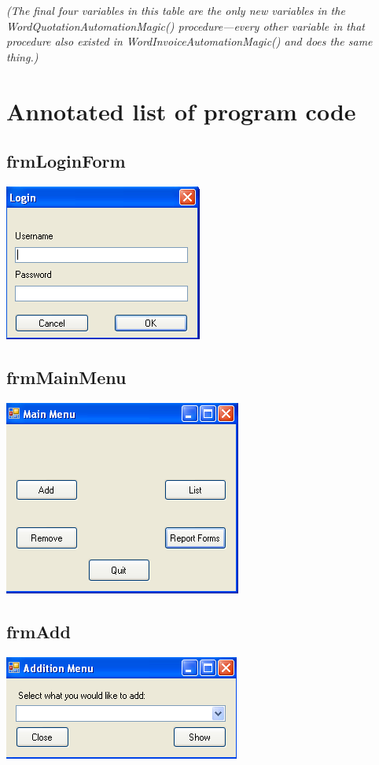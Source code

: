 	\textsl{(The final four variables in this table are the only new variables in the WordQuotationAutomationMagic() procedure---every other variable in that procedure also existed in WordInvoiceAutomationMagic() and does the same thing.)} 

	\section{Annotated list of program code}
	
\subsection{frmLoginForm}
	\includegraphics[scale=0.5]{frmLoginForm_scrot}
	

\subsection{frmMainMenu}
	\includegraphics[scale=0.5]{frmMainMenu_scrot}
	

\subsection{frmAdd}
	\includegraphics[scale=0.5]{frmAdd_scrot}
	


